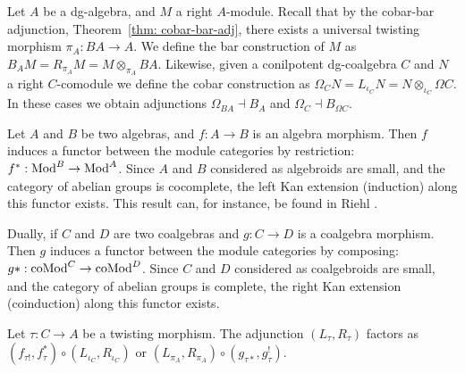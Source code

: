 \documentclass[../thesis.tex]{subfiles}
\begin{document}
            Let $A$ be a dg-algebra, and $M$ a right $A$-module. Recall that by the cobar-bar adjunction, Theorem~\ref{thm: cobar-bar-adj}, there exists a universal twisting morphism $\pi_A: BA \rightarrow A$. We define the bar construction of $M$ as $B_AM = R_{\pi_A}M = M\otimes_{\pi_A}BA$. Likewise, given a conilpotent dg-coalgebra $C$ and $N$ a right $C$-comodule we define the cobar construction as $\Omega_CN = L_{\iota_C}N = N\otimes_{\iota_C}\Omega C$. In these cases we obtain adjunctions $\Omega_{BA} \dashv B_A$ and $\Omega_C \dashv B_{\Omega C}$.

            Let $A$ and $B$ be two algebras, and $f: A \rightarrow B$ is an algebra morphism. Then $f$ induces a functor between the module categories by restriction: $f^*: \tt{Mod}^B \rightarrow \tt{Mod}^A$. Since $A$ and $B$ considered as algebroids are small, and the category of abelian groups is cocomplete, the left Kan extension (induction) along this functor exists. This result can, for instance, be found in Riehl \cite{Riehl14}.
            \begin{center}
            \end{center}

            Dually, if $C$ and $D$ are two coalgebras and $g: C \rightarrow D$ is a coalgebra morphism. Then $g$ induces a functor between the module categories by composing: $g*: \tt{coMod}^C \rightarrow \tt{coMod}^D$. Since $C$ and $D$ considered as coalgebroids are small, and the category of abelian groups is complete, the right Kan extension (coinduction) along this functor exists.
            \begin{center}
            \end{center}

            \begin{lemma}\label{lem: twist-fac}
                Let $\tau: C \rightarrow A$ be a twisting morphism. The adjunction $(L_\tau, R_\tau)$ factors as $(f_{\tau !}, f_\tau^*)\circ (L_{\iota_C},R_{\iota_C})$ or $(L_{\pi_A},R_{\pi_A})\circ (g_{\tau *}, g_\tau^!)$.
            \end{lemma}
\end{document}
